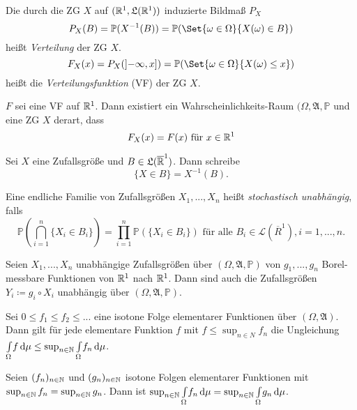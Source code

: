 \documentclass{cheat-sheet}
\newcommand{\Alg}{\mathfrak{A}}
\newcommand{\LebAlg}{\mathfrak{L}} %
\renewcommand{\P}{\mathbb{P}}
\newcommand{\IntOmu}[1]{\Int{\Omega}{}{#1}{\mu}} %
\begin{document}
\begin{defn}
  Die durch die ZG $X$ auf $(\R^1, \LebAlg(\R^1))$ induzierte Bildmaß $P_X$
  \[ P_X(B) = \P(X^{-1}(B)) = \P(\Set{ \omega \in \Omega  }{ X(\omega) \in B }) \]
  heißt \emph{Verteilung} der ZG $X$.
  \[ F_X(x) = P_X(\left]-\infty, x\right]) = \P(\Set{ \omega \in \Omega }{ X(\omega) \leq x }) \]
  heißt die \emph{Verteilungsfunktion} (VF) der ZG $X$.
\end{defn}

\begin{satz}
  $F$ sei eine VF auf $\mathbb{R}^1$. Dann existiert ein Wahrscheinlichkeits-Raum $(\Omega, \Alg, \P$ und eine ZG $X$ derart, dass
  \[ F_X(x) = F(x) \text{ für } x \in \mathbb{R}^1 \]
\end{satz}

\begin{nota}
  Sei $X$ eine Zufallsgröße und $B \in \LebAlg(\overline{\R}^1)$. Dann schreibe
  \[ \{ X \in B \} = X^{-1}(B). \]
\end{nota}

\begin{defn}
  Eine endliche Familie von Zufallsgrößen $X_1, ..., X_n$ heißt \emph{stochastisch unabhängig}, falls
  \[ \P(\bigcap_{i=1}^n \{ X_i \in B_i \}) = \prod_{i=1}^n \P(\{ X_i \in B_i \}) \text{ für alle } B_i \in \mathcal{L}(\overline{R}^1), i = 1, ..., n. \]
\end{defn}

\begin{satz}
  Seien $X_1, ..., X_n$ unabhängige Zufallsgrößen über $(\Omega, \Alg, \P)$ von $g_1, ..., g_n$ Borel-messbare Funktionen von $\mathbb{R}^1$ nach $\mathbb{R}^1$. Dann sind auch die Zufallsgrößen $Y_i \coloneqq g_i \circ X_i$ unabhängig über $(\Omega, \Alg, \P)$.
\end{satz}



\begin{satz}
  Sei $0 \leq f_1 \leq f_2 \leq ...$ eine isotone Folge elementarer Funktionen über $(\Omega, \Alg)$. Dann gilt für jede elementare Funktion $f$ mit $f \leq \sup_{n \in N} f_n$ die Ungleichung $\IntOmu{f} \leq \sup_{n \in \N} \IntOmu{f_n}$.
\end{satz}

\begin{satz}
  Seien $(f_n)_{n \in \mathbb{N}}$ und $(g_n)_{n \in \mathbb{N}}$ isotone Folgen elementarer Funktionen mit $\sup_{n \in \mathbb{N}} f_n = \sup_{n \in \mathbb{N}} g_n$. Dann ist $\sup_{n \in \N} \IntOmu{f_n} = \sup_{n \in \N} \IntOmu{g_n}$.
\end{satz}
\end{document}
